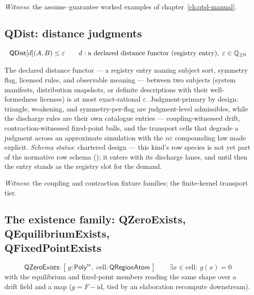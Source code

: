 \emph{Witness}: the assume--guarantee worked examples of
chapter~\ref{ch:qtsl-manual}.



\subsection{QDist: distance judgments}
\label{sec:spec-lang-qdist}

\[
\mathsf{QDist}[d](A, B) \le \varepsilon
\qquad
d : \text{a declared distance functor (registry entry)},\;
\varepsilon \in \mathbb{Q}_{\ge 0}
\]

The declared distance functor --- a registry entry naming subject
sort, symmetry flag, licensed rules, and observable meaning ---
between two subjects (system manifests, distribution snapshots, or
definite descriptions with their well-formedness licenses) is at most
exact-rational $\varepsilon$. Judgment-primary by design: triangle,
weakening, and symmetry-per-flag are judgment-level admissibles,
while the discharge rules are their own catalogue entries ---
coupling-witnessed drift, contraction-witnessed fixed-point balls,
and the transport cells that degrade a judgment across an approximate
simulation with the $n\varepsilon$ compounding law made explicit.
\emph{Schema status}: chartered design --- this kind's row species
is not yet part of the normative row schema
(); it enters with its discharge lanes,
and until then the entry stands as the registry slot for the
demand.

\emph{Witness}: the coupling and contraction fixture families; the
finite-kernel transport tier.



\subsection{\texorpdfstring{The existence family: QZeroExists, QEquilibriumExists,\protect\\ QFixedPointExists}{The existence family: QZeroExists, QEquilibriumExists, QFixedPointExists}}
\label{sec:spec-lang-qexists}

\[
\mathsf{QZeroExists} : [\, g : \mathsf{Poly}^{m},\;
  \mathrm{cell} : \mathsf{QRegionAtom} \,]
\qquad
\exists x \in \mathrm{cell} :\ g(x) = 0
\]
with the equilibrium and fixed-point members reading the same shape
over a drift field and a map ($g = F - \mathrm{id}$, tied by an
elaboration recompute downstream).

